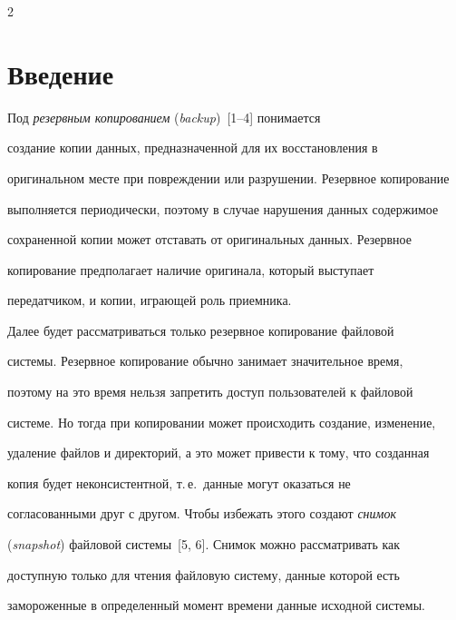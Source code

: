       \begin{multicols}{2}





      \label{st\stat}





\section{Введение}





      Под \textit{резервным копированием} (\textit{backup})~[1--4] понимается 


создание копии данных, предназначенной для их восстановления в 


оригинальном месте при повреждении или разрушении. Резервное копирование 


выполняется периодически,  поэтому в случае нарушения данных содержимое 


сохраненной копии может отставать от оригинальных данных.  Резервное 


копирование предполагает наличие оригинала, который выступает 


передатчиком, и копии, играющей роль приемника. 


      


      Далее будет рассматриваться только резервное копирование файловой 


системы.  Резервное копирование обычно занимает значительное время, 


поэтому на это время нельзя запретить доступ пользователей к файловой 


системе. Но тогда при копировании может происходить создание, изменение, 


удаление файлов и директорий, а это может привести к тому, что созданная 


копия будет неконсистентной, т.\,е.\ данные могут оказаться не 


согласованными друг с другом. Чтобы избежать этого создают \textit{снимок} 


(\textit{snapshot}) файловой системы~[5, 6]. Снимок можно рассматривать как 


доступную только для чтения файловую систему, данные которой есть 


замороженные в определенный момент времени данные исходной системы. 



\end{multicols}
